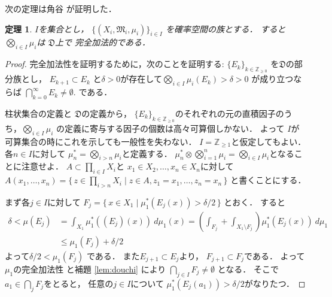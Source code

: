\documentclass[leqno, a4paper, 12pt]{jsarticle}
\newtheorem{thm}{定理}
\newcommand{\zz}{\mathbb{Z}}
\begin{document}
次の定理は角谷 \cite{Kaku} が証明した．
\begin{thm}\label{thm:kakutani}
$I$を集合とし，
$\{(X_{i}, \mathfrak{M}_{i}, \mu_{i})\}_{i\in I}$
を確率空間の族とする．
すると
$\bigotimes_{i\in I}\mu_{i}$は
$\mathfrak{D}$上で
完全加法的である．
\end{thm}
\begin{proof}
完全加法性を証明するために，次のことを証明する:
$\{E_{k}\}_{k\in \zz_{\ge 0}}$
を$\mathfrak{D}$の部分族とし，
$E_{k+1}\subset E_{k}$
と$\delta>0$が存在して$\bigotimes_{i\in I}\mu_{i}(E_{k})>\delta>0$
が成り立つならば
$\bigcap_{k=0}^{\infty}E_{k}\neq \emptyset$. 
である．

柱状集合の定義と
$\mathfrak{D}$の定義から，
$\{E_{k}\}_{k\in \zz_{\ge 0}}$のそれぞれの元の直積因子のうち，$\bigotimes_{i\in I}\mu_{i}$
の定義に寄与する因子の個数は高々可算個しかない．
よって
$I$が可算集合の時にこれを示しても一般性を失わない．
$I=\zz_{\ge 1}$と仮定してもよい．
各$n\in I$に対して
$\mu_{n}^{*}=\bigotimes_{i> n}\mu_{i}$と定義する．
$\mu_{n}^{*}\otimes \bigotimes_{i=1}^{n}\mu_{i}
=\bigotimes_{i\in I}\mu_{i}$となることに注意せよ．
$A\subset \prod_{i\in I}X_{i}$と
$x_{1}\in X_{2}, \dots, x_{n}\in X_{n}$に対して
$A(x_{1}, \dots, x_{n})=
\{\, z\in \prod_{i>n}X_{i}\mid 
z\in A, z_{1}=x_{1}, \dots, z_{n}=x_{n}
\, \}$
と書くことにする．

まず各$j\in I$に対して
$F_{j}=\{\,
 x\in X_{1}\mid 
\mu_{1}^{*}(E_{j}({x}))>\delta/2
\, \}$
とおく．
すると
\begin{align*}
\delta<\mu(E_{j})&=
\int_{X_{1}}\mu_{1}^{*}((E_{j})({x}))\ d\mu_{1}(x)
=
\left(\int_{F_{j}}+\int_{X_{1}\setminus F_{j}}\right)
\mu_{1}^{*}(E_{j}(x))\ d\mu_{1}\\
&
\le \mu_{1}(F_{j})+\delta/2
\end{align*}
よって$\delta/2<\mu_{1}(F_{j})$
である．
また$E_{j+1}\subset E_{j}$より，
$F_{j+1}\subset F_{j}$である．
よって$\mu_{1}$の完全加法性
と補題 \ref{lem:douchi} により
$\bigcap_{j\in I}F_{j}\neq \emptyset$
となる．
そこで
$a_{1}\in \bigcap_{j}F_{j}$をとると，
任意の$j\in I$について
$\mu_{1}^{*}(E_{j}(a_{1}))>\delta/2$がなりたつ．


\end{proof}
\end{document}

